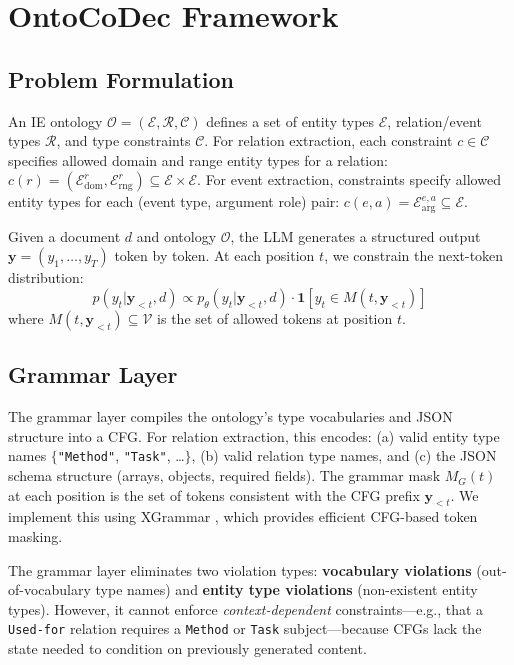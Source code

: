 \documentclass[11pt]{article}
\begin{document}
\section{OntoCoDec Framework}

\subsection{Problem Formulation}

An IE ontology $\mathcal{O} = (\mathcal{E}, \mathcal{R}, \mathcal{C})$ defines a set of entity types $\mathcal{E}$, relation/event types $\mathcal{R}$, and type constraints $\mathcal{C}$.
For relation extraction, each constraint $c \in \mathcal{C}$ specifies allowed domain and range entity types for a relation: $c(r) = (\mathcal{E}_{\text{dom}}^r, \mathcal{E}_{\text{rng}}^r) \subseteq \mathcal{E} \times \mathcal{E}$.
For event extraction, constraints specify allowed entity types for each (event type, argument role) pair: $c(e, a) = \mathcal{E}_{\text{arg}}^{e,a} \subseteq \mathcal{E}$.

Given a document $d$ and ontology $\mathcal{O}$, the LLM generates a structured output $\mathbf{y} = (y_1, \ldots, y_T)$ token by token.
At each position $t$, we constrain the next-token distribution:
\begin{equation}
p(y_t | \mathbf{y}_{<t}, d) \propto p_\theta(y_t | \mathbf{y}_{<t}, d) \cdot \mathbf{1}[y_t \in M(t, \mathbf{y}_{<t})]
\end{equation}
where $M(t, \mathbf{y}_{<t}) \subseteq \mathcal{V}$ is the set of allowed tokens at position $t$.

\subsection{Grammar Layer}

The grammar layer compiles the ontology's type vocabularies and JSON structure into a CFG.
For relation extraction, this encodes:
(a) valid entity type names $\{$\texttt{"Method"}, \texttt{"Task"}, \ldots$\}$,
(b) valid relation type names, and
(c) the JSON schema structure (arrays, objects, required fields).
The grammar mask $M_G(t)$ at each position is the set of tokens consistent with the CFG prefix $\mathbf{y}_{<t}$.
We implement this using XGrammar \cite{dong2024xgrammar}, which provides efficient CFG-based token masking.

The grammar layer eliminates two violation types: \textbf{vocabulary violations} (out-of-vocabulary type names) and \textbf{entity type violations} (non-existent entity types).
However, it cannot enforce \textit{context-dependent} constraints---e.g., that a \texttt{Used-for} relation requires a \texttt{Method} or \texttt{Task} subject---because CFGs lack the state needed to condition on previously generated content.
\end{document}
